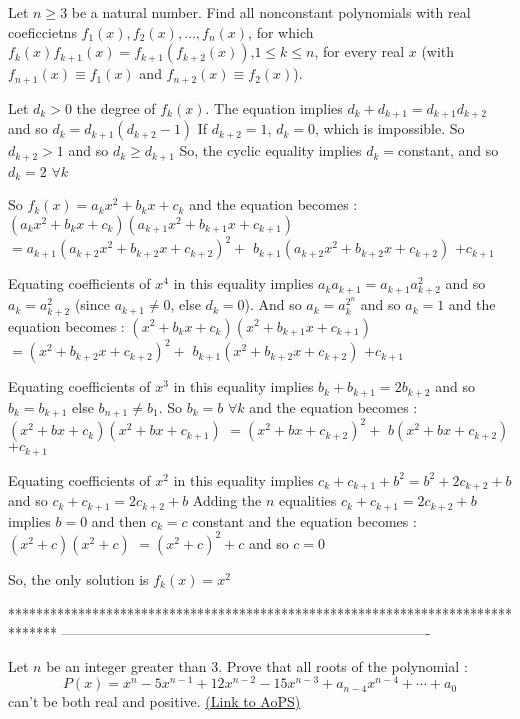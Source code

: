 \begin{solution}
	\begin{tcolorbox}Let $ n\ge 3$ be a natural number. Find all nonconstant polynomials with real coeficcietns $ f_{1}\left(x\right),f_{2}\left(x\right),\ldots,f_{n}\left(x\right)$, for which
$ f_{k}\left(x\right)f_{k + 1}\left(x\right) = f_{k + 1}\left(f_{k + 2}\left(x\right)\right)$,$ 1\le k\le n$,
for every real $ x$ (with $ f_{n + 1}\left(x\right)\equiv f_{1}\left(x\right)$ and $ f_{n + 2}\left(x\right)\equiv f_{2}\left(x\right)$).\end{tcolorbox}

Let $ d_k>0$ the degree of $ f_k(x)$. The equation implies $ d_k+d_{k+1}=d_{k+1}d_{k+2}$ and so $ d_k=d_{k+1}(d_{k+2}-1)$
If $ d_{k+2}=1$, $ d_k=0$, which is impossible. So $ d_{k+2}>1$ and so $ d_k\geq d_{k+1}$
So, the cyclic equality implies $ d_k=$constant, and so $ d_k=2$ $ \forall k$

So $ f_k(x)=a_kx^2+b_kx+c_k$ and the equation becomes :
$ (a_kx^2+b_kx+c_k)(a_{k+1}x^2+b_{k+1}x+c_{k+1})$ $ =a_{k+1}(a_{k+2}x^2+b_{k+2}x+c_{k+2})^2+$ $ b_{k+1}(a_{k+2}x^2+b_{k+2}x+c_{k+2})$ $ +c_{k+1}$

Equating coefficients of $ x^4$ in this equality implies $ a_ka_{k+1}=a_{k+1}a_{k+2}^2$ and so $ a_k=a_{k+2}^2$ (since $ a_{k+1}\neq 0$, else $ d_k=0$). And so $ a_k=a_k^{2^n}$ and so $ a_k=1$ and the equation becomes :
$ (x^2+b_kx+c_k)(x^2+b_{k+1}x+c_{k+1})$ $ =(x^2+b_{k+2}x+c_{k+2})^2+$ $ b_{k+1}(x^2+b_{k+2}x+c_{k+2})$ $ +c_{k+1}$

Equating coefficients of $ x^3$ in this equality implies $ b_k+b_{k+1}=2b_{k+2}$ and so $ b_k=b_{k+1}$ else $ b_{n+1}\neq b_1$. 
So $ b_k=b$ $ \forall k$ and the equation becomes :
$ (x^2+bx+c_k)(x^2+bx+c_{k+1})$ $ =(x^2+bx+c_{k+2})^2+$ $ b(x^2+bx+c_{k+2})$ $ +c_{k+1}$

Equating coefficients of $ x^2$ in this equality implies $ c_k+c_{k+1}+b^2=b^2+2c_{k+2}+b$ and so $ c_k+c_{k+1}=2c_{k+2}+b$
Adding the $ n$ equalities $ c_k+c_{k+1}=2c_{k+2}+b$ implies $ b=0$ and then $ c_k=c$ constant and the equation becomes :
$ (x^2+c)(x^2+c)$ $ =(x^2+c)^2+c$ and so $ c=0$

So, the only solution is $ f_k(x)=x^2$
\end{solution}
*******************************************************************************
-------------------------------------------------------------------------------

\begin{problem}
	Let $ n$ be an integer greater than $3$. Prove that all roots of the polynomial :
\[P(x)=x^n-5x^{n-1}+12x^{n-2}-15x^{n-3}+a_{n-4}x^{n-4}+\cdots+a_0\] 
can't be both real and positive.
	\flushright \href{https://artofproblemsolving.com/community/c6h286480}{(Link to AoPS)}
\end{problem}



